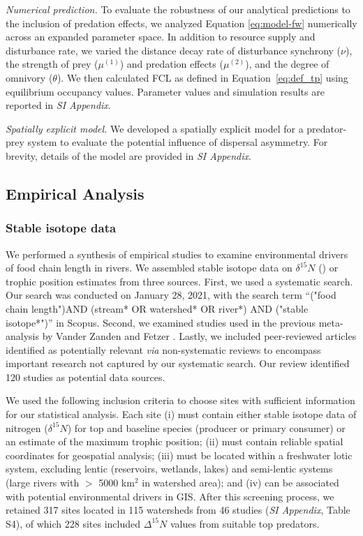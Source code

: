 \documentclass[9pt,twocolumn,twoside]{pnas-new}
\begin{document}
\textit{Numerical prediction.}
To evaluate the robustness of our analytical predictions to the inclusion of predation effects, we analyzed Equation \ref{eq:model-fw} numerically across an expanded parameter space. 
In addition to resource supply and disturbance rate, we varied the distance decay rate of disturbance synchrony ($\nu$), the strength of prey ($\mu^{(1)}$) and predation effects ($\mu^{(2)}$), and the degree of omnivory ($\theta$). 
We then calculated FCL as defined in Equation~\ref{eq:def_tp} using equilibrium occupancy values. 
Parameter values and simulation results are reported in \textit{SI Appendix}.

\textit{Spatially explicit model.}
We developed a spatially explicit model for a predator-prey system to evaluate the potential influence of dispersal asymmetry. 
For brevity, details of the model are provided in \textit{SI Appendix}.

\subsection{Empirical Analysis}

\subsubsection*{Stable isotope data}

We performed a synthesis of empirical studies to examine environmental drivers of food chain length in rivers.
We assembled stable isotope data on $\delta^{15} N$ (\textperthousand) or trophic position estimates from three sources.
First, we used a systematic search. 
Our search was conducted on January 28, 2021, with the search term ``("food chain length")AND (stream* OR watershed* OR river*) AND ("stable isotope*")'' in Scopus.
Second, we examined studies used in the previous meta-analysis by Vander Zanden and Fetzer \citep{vander_zanden_global_2007}.
Lastly, we included peer-reviewed articles identified as potentially relevant \textit{via} non-systematic reviews to encompass important research not captured by our systematic search.
Our review identified 120 studies as potential data sources.

We used the following inclusion criteria to choose sites with sufficient information for our statistical analysis.
Each site (i) must contain either stable isotope data of nitrogen ($\delta^{15}N$) for top and baseline species (producer or primary consumer) or an estimate of the maximum trophic position; 
(ii) must contain reliable spatial coordinates for geospatial analysis; 
(iii) must be located within a freshwater lotic system, excluding lentic (reservoirs, wetlands, lakes) and semi-lentic systems (large rivers with $>$ 5000 km$^2$ in watershed area); and (iv) can be associated with potential environmental drivers in GIS.
After this screening process, we retained 317 sites located in 115 watersheds from 46 studies (\textit{SI Appendix}, Table S4), of which 228 sites included $\Delta^{15}N$ values from suitable top predators. 
\end{document}
